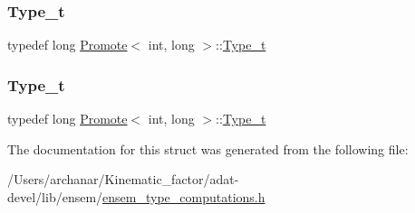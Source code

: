 \subsubsection{\texorpdfstring{Type\_t}{Type\_t}\hspace{0.1cm}{\footnotesize\ttfamily [2/3]}}
{\footnotesize\ttfamily typedef long \mbox{\hyperlink{structPromote}{Promote}}$<$ int, long $>$\+::\mbox{\hyperlink{structPromote_3_01int_00_01long_01_4_a91635f57c2365f0636c638aa4f311374}{Type\+\_\+t}}}

\mbox{\label{structPromote_3_01int_00_01long_01_4_a91635f57c2365f0636c638aa4f311374}} 
\subsubsection{\texorpdfstring{Type\_t}{Type\_t}\hspace{0.1cm}{\footnotesize\ttfamily [3/3]}}
{\footnotesize\ttfamily typedef long \mbox{\hyperlink{structPromote}{Promote}}$<$ int, long $>$\+::\mbox{\hyperlink{structPromote_3_01int_00_01long_01_4_a91635f57c2365f0636c638aa4f311374}{Type\+\_\+t}}}



The documentation for this struct was generated from the following file\+:\begin{DoxyCompactItemize}
\item 
/\+Users/archanar/\+Kinematic\+\_\+factor/adat-\/devel/lib/ensem/\mbox{\hyperlink{adat-devel_2lib_2ensem_2ensem__type__computations_8h}{ensem\+\_\+type\+\_\+computations.\+h}}\end{DoxyCompactItemize}

